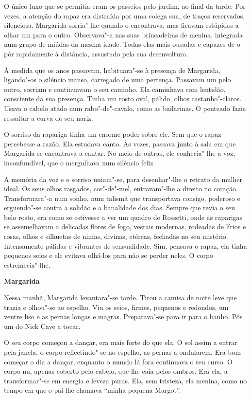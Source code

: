 O único luxo que se permitia eram os passeios pelo jardim, ao final da
tarde. Por vezes, a atenção do rapaz era distraída por uma colega sua,
de traços reservados, silenciosa. Margarida sorria"-lhe quando o
encontrava, mas ficavam estúpidos a olhar um para o outro. Observava"-a
nas suas brincadeiras de menina, integrada num grupo de miúdas da mesma
idade. Todas elas mais ousadas e capazes de o pôr rapidamente à
distância, assustado pela sua desenvoltura.

À medida que os anos passavam, habituara"-se à presença de Margarida,
ligando"-os o silêncio manso, carregado de uma pertença. Passavam um pelo
outro, sorriam e continuavam o seu caminho. Ela caminhava com lentidão,
consciente da sua presença. Tinha um rosto oval, pálido, olhos
castanho"-claros. Usava o cabelo atado num rabo"-de"-cavalo, como as
bailarinas. O penteado fazia ressaltar a curva do seu nariz.

O sorriso da rapariga tinha um enorme poder sobre ele. Sem que o rapaz
percebesse a razão. Ela estudava canto. Às vezes, passava junto à sala
em que Margarida se encontrava a cantar. No meio de outras, ele
conhecia"-lhe a voz, inconfundível, que o mergulhava num silêncio feliz.

A memória da voz e o sorriso uniam"-se, para desenhar"-lhe o retrato da
mulher ideal. Os seus olhos rasgados, cor"-de"-mel, entravam"-lhe a direito
no coração. Transformara"-a num sonho, num talismã que transportava
consigo, poderoso e erguendo"-se contra a solidão e a banalidade dos
dias. Sempre que revia o seu belo rosto, era como se estivesse a ver um
quadro de Rossetti, onde as raparigas se assemelhavam a delicadas flores
de fogo, vestais modernas, rodeadas de lírios e rosas, olhos e silhuetas
de ninfas, divinas, etéreas, fechadas no seu mistério. Intensamente
pálidas e vibrantes de sensualidade. Sim, pensava o rapaz, ela tinha
pequenos seios e ele evitava olhá-los para não se perder neles. O corpo
estremecia"-lhe.

\vspace*{1.8cm}
\noindent{}\textbf{Margarida}

\bigskip

Nessa manhã, Margarida levantara"-se tarde. Tirou a camisa de noite leve
que trazia e olhou"-se ao espelho. Viu os seios, firmes, pequenos e
redondos, um ventre liso e as pernas longas e magras. Preparava"-se para
ir para o banho. Pôs um  do Nick Cave a tocar.

O seu corpo começou a dançar, era mais forte do que ela. O sol assim a
entrar pela janela, o corpo reflectindo"-se no espelho, as pernas a
ondularem. Era bom começar o dia a dançar, enquanto o mundo lá fora
continuava o seu curso. O corpo nu, apenas coberto pelo cabelo, que lhe
caía pelos ombros. Era ela, a transformar"-se em energia e leveza puras.
Ela, sem tristeza, ela menina, como no tempo em que o pai lhe chamava
``minha pequena Margot''.

